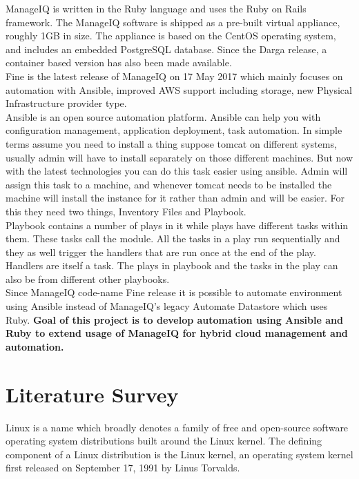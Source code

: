 \documentclass[a4paper,12pt]{report}
\begin{document}
ManageIQ is written in the Ruby language and uses the Ruby on Rails framework. The ManageIQ software is shipped as a pre-built virtual appliance, roughly 1GB in size. The appliance is based on the CentOS operating system, and includes an embedded PostgreSQL database. Since the Darga release, a container based version has also been made available.\\

Fine is the latest release of ManageIQ on 17 May 2017 which mainly focuses on automation with Ansible, improved AWS support including storage, new Physical Infrastructure provider type.\\

Ansible is an open source automation platform. Ansible can help you with configuration management, application deployment, task automation. In simple terms assume you need to install a thing suppose tomcat on different systems, usually admin will have to install separately on those different machines. But now with the latest technologies you can do this task easier using ansible. Admin will assign this task to a machine, and whenever tomcat needs to be installed the machine will install the instance for it rather than admin and will be easier. For this they need two things, Inventory Files and Playbook.\\

Playbook contains a number of plays in it while plays have different tasks within them. These tasks call the module. All the tasks in a play run sequentially and they as well trigger the handlers that are run once at the end of the play. Handlers are itself a task. The plays in playbook and the tasks in the play can also be from different other playbooks.\\

Since ManageIQ code-name Fine release it is possible to automate environment using Ansible instead of ManageIQ's legacy Automate Datastore which uses Ruby. \textbf{Goal of this project is to develop automation using Ansible and Ruby to extend usage of ManageIQ for hybrid cloud management and automation.}


\chapter{Literature Survey}

Linux is a name which broadly denotes a family of free and open-source software operating system distributions built around the Linux kernel. The defining component of a Linux distribution is the Linux kernel, an operating system kernel first released on September 17, 1991 by Linus Torvalds.\\
\end{document}
